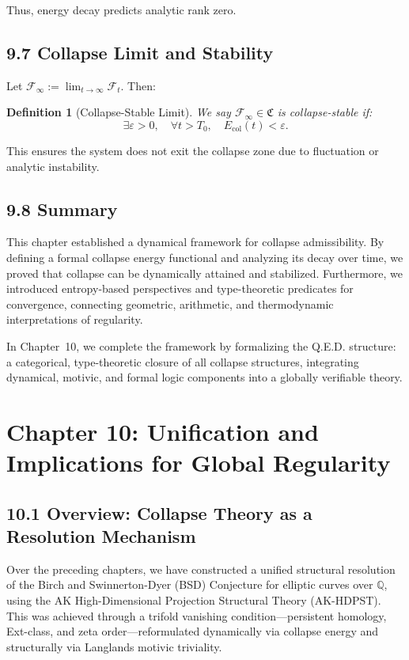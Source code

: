 \documentclass[11pt]{article}
\newtheorem{definition}[theorem]{Definition}
\begin{document}
Thus, energy decay predicts analytic rank zero.

\subsection*{9.7 Collapse Limit and Stability}

Let \( \mathcal{F}_\infty := \lim_{t \to \infty} \mathcal{F}_t \). Then:

\begin{definition}[Collapse-Stable Limit]
We say \( \mathcal{F}_\infty \in \mathfrak{C} \) is collapse-stable if:
\[
\exists \varepsilon > 0,\quad \forall t > T_0,\quad E_{\mathrm{col}}(t) < \varepsilon.
\]
\end{definition}

This ensures the system does not exit the collapse zone due to fluctuation or analytic instability.

\subsection*{9.8 Summary}

This chapter established a dynamical framework for collapse admissibility. By defining a formal collapse energy functional and analyzing its decay over time, we proved that collapse can be dynamically attained and stabilized. Furthermore, we introduced entropy-based perspectives and type-theoretic predicates for convergence, connecting geometric, arithmetic, and thermodynamic interpretations of regularity.

In Chapter~10, we complete the framework by formalizing the Q.E.D. structure: a categorical, type-theoretic closure of all collapse structures, integrating dynamical, motivic, and formal logic components into a globally verifiable theory.



\section{Chapter 10: Unification and Implications for Global Regularity}
\label{sec:collapse-qed}

\subsection*{10.1 Overview: Collapse Theory as a Resolution Mechanism}

Over the preceding chapters, we have constructed a unified structural resolution of the Birch and Swinnerton-Dyer (BSD) Conjecture for elliptic curves over \( \mathbb{Q} \), using the AK High-Dimensional Projection Structural Theory (AK-HDPST). This was achieved through a trifold vanishing condition—persistent homology, Ext-class, and zeta order—reformulated dynamically via collapse energy and structurally via Langlands motivic triviality.
\end{document}
